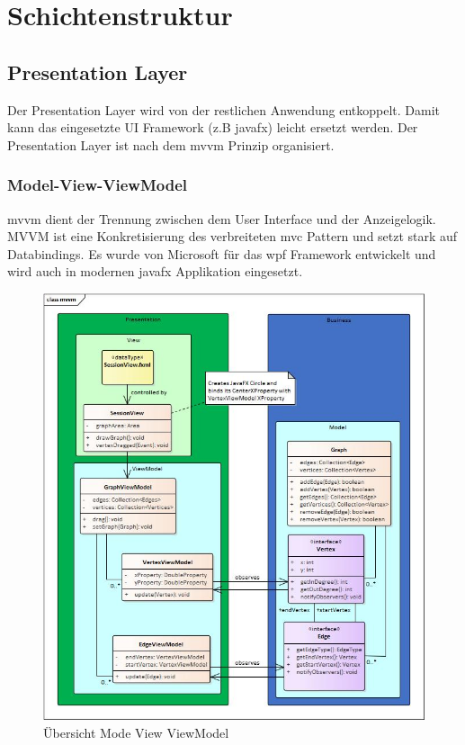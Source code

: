 \documentclass[11pt,a4paper,english,oneside]{book}
\numberwithin{equation}{chapter}
\begin{document}
	\clearpage
	
	\section{Schichtenstruktur} \label{ssec:layer-architecture}
	
	\subsection{Presentation Layer}
	Der Presentation Layer wird von der restlichen Anwendung entkoppelt. Damit kann das eingesetzte UI Framework (z.B \gls{javafx}) leicht ersetzt werden. Der Presentation Layer ist nach dem \gls{mvvm} Prinzip organisiert.
	
	\subsubsection{Model-View-ViewModel} \label{sssec:mvvm}
	\gls{mvvm} dient der Trennung zwischen dem User Interface und der Anzeigelogik. MVVM ist eine Konkretisierung des verbreiteten \gls{mvc} Pattern und setzt stark auf Databindings. Es wurde von Microsoft für das \gls{wpf} Framework entwickelt und wird auch in modernen \gls{javafx} Applikation eingesetzt.
	
	\begin{figure}[h!]
		\centering
		\includegraphics[width=0.7\linewidth]{assets/images/mvvm_concept}
		\caption[MVVM Konzept]{Übersicht Mode View ViewModel}
		\label{fig:mvvmconcept}
	\end{figure}
	
\end{document}
